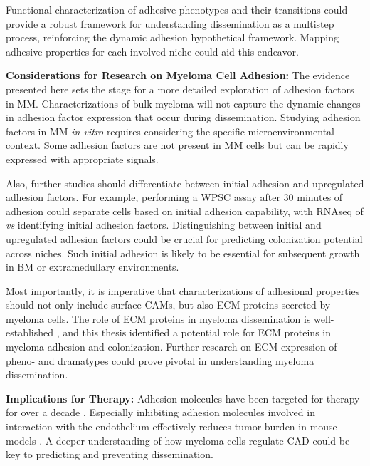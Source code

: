 Functional characterization of adhesive phenotypes  and their transitions could provide a robust framework for
understanding dissemination as a multistep process, reinforcing the dynamic
adhesion hypothetical framework. Mapping adhesive properties for each involved
niche could aid this endeavor.




\textbf{Considerations for Research on Myeloma Cell Adhesion:}
The evidence presented here sets the stage for a more detailed exploration of
adhesion factors in MM. Characterizations of bulk myeloma will not capture
the dynamic changes in adhesion factor expression that occur during dissemination.
Studying adhesion factors in MM \textit{in vitro} requires considering the
specific microenvironmental context. Some adhesion factors are not present in MM
cells but can be rapidly expressed with appropriate signals.

Also, further studies should differentiate between initial adhesion and
upregulated adhesion factors. For example, performing a \ac{WPSC} assay after 30
minutes of adhesion could separate \INA cells based on initial adhesion
capability, with RNAseq of \nMAina \textit{vs} \MAina identifying initial
adhesion factors. Distinguishing between initial and upregulated adhesion
factors could be crucial for predicting colonization potential across niches.
Such initial adhesion is likely to be essential for subsequent growth in \ac{BM}
or extramedullary environments.

Most importantly, it is imperative that characterizations of adhesional
properties should not only include surface \acp{CAM}, but also \ac{ECM} proteins
secreted by myeloma cells. The role of \ac{ECM} proteins in myeloma
dissemination is well-established \cite{ibraheemBMMSCsderivedECMModifies2019},
and this thesis identified a potential role for \ac{ECM} proteins in myeloma
adhesion and colonization. Further research on \ac{ECM}-expression of pheno- and
dramatypes could prove pivotal in understanding myeloma dissemination.


\textbf{Implications for Therapy:}
Adhesion molecules have been targeted for therapy for over a decade
\cite{nairChapterSixEmerging2012, neriTargetingAdhesionMolecules2012}.
Especially inhibiting adhesion molecules involved in interaction with the
endothelium effectively reduces tumor burden in mouse models
\cite{asosinghUniquePathwayHoming2001a,
mrozikTherapeuticTargetingNcadherin2015}. A deeper understanding of how myeloma
cells regulate \ac{CAD} could be key to predicting and preventing dissemination.

